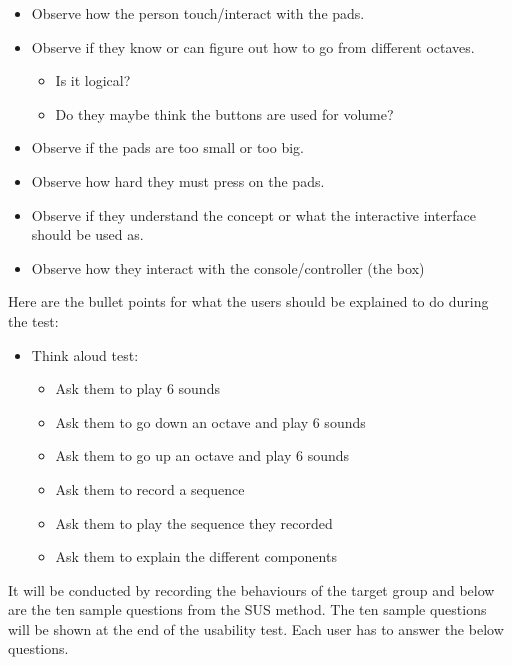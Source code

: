 \begin{itemize} 
\item 	Observe how the person touch/interact with the pads. 
\item	Observe if they know or can figure out how to go from different octaves. 
	\begin{itemize} 
		\item 	Is it logical? 
		\item 	Do they maybe think the buttons are used for volume? 
	\end{itemize} 
\item 	Observe if the pads are too small or too big.
\item 	Observe how hard they must press on the pads. 
\item 	Observe if they understand the concept or what the interactive interface should be used as. 
\item 	Observe how they interact with the console/controller (the box)
\end{itemize}
\par
Here are the bullet points for what the users should be explained to do during the test: \par
\begin{itemize} 
\item 	Think aloud test:
	\begin{itemize}  
		\item 	Ask them to play 6 sounds 
		\item 	Ask them to go down an octave and play 6 sounds
		\item   Ask them to go up an octave and play 6 sounds
		\item 	Ask them to record a sequence
		\item   Ask them to play the sequence they recorded
		\item 	Ask them to explain the different components 
	\end{itemize} 
\end{itemize} \par
It will be conducted by recording the behaviours of the target group and below are the ten sample questions from the SUS method. The ten sample questions will be shown at the end of the usability test. Each user has to answer the below questions. 
\par
